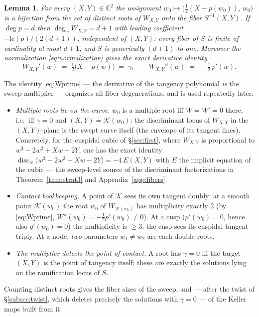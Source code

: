 \documentclass[11pt]{article}
\theoremstyle{plain}
\newtheorem{lemma}[theorem]{Lemma}
\theoremstyle{definition}
\theoremstyle{remark}
\newcommand{\C}{\mathbb{C}}
\begin{document}
\begin{lemma}\label{lem:fibroots}
For every $(X,Y)\in\C^2$ the assignment
$w_0\mapsto\bigl(\tfrac12(X-p(w_0)),\,w_0\bigr)$ is a bijection from the set
of distinct roots of $W_{X,Y}$ onto the fiber $S^{-1}(X,Y)$. If $\deg p=d$
then $\deg_wW_{X,Y}=d+1$ with leading coefficient
$-\mathrm{lc}(p)/(2(d+1))$, independent of $(X,Y)$: every fiber of $S$ is
finite of cardinality at most $d+1$, and $S$ is generically $(d+1)$-to-one.
Moreover the normalization \eqref{eq:normalization} gives the exact derivative
identity
\begin{equation}\label{eq:Wprime}
W_{X,Y}'(w)\;=\;\tfrac12\bigl(X-p(w)\bigr)\;=\;\gamma ,
\qquad
W_{X,Y}''(w)\;=\;-\tfrac12\,p'(w) .
\end{equation}
\end{lemma}

The identity \eqref{eq:Wprime} --- the derivative of the tangency polynomial
\emph{is} the sweep multiplier --- organizes all fiber degenerations, and is
used repeatedly later:
\begin{itemize}
\item \emph{Multiple roots lie on the curve.} $w_0$ is a multiple root iff
$W=W'=0$ there, i.e.\ iff $\gamma=0$ and $(X,Y)=\mathcal K(w_0)$: the
discriminant locus of $W_{X,Y}$ in the $(X,Y)$-plane is the swept curve
itself (the envelope of its tangent lines). Concretely, for the cuspidal cubic
of \S\ref{sec:first}, where $W_{X,Y}$ is proportional to $w^3-2w^2+Xw-2Y$,
one has the exact identity
$\operatorname{disc}_w\bigl(w^3-2w^2+Xw-2Y\bigr)=-4\,E(X,Y)$ with $E$ the
implicit equation of the cubic --- the sweep-level source of the discriminant
factorizations in Theorem~\ref{thm:strat3} and Appendix~\ref{app:fibers}.
\item \emph{Contact bookkeeping.} A point of $\mathcal K$ sees its own
tangent doubly: at a smooth point $\mathcal K(w_0)$ the root $w_0$ of
$W_{\mathcal K(w_0)}$ has multiplicity exactly $2$ (by \eqref{eq:Wprime},
$W''(w_0)=-\tfrac12p'(w_0)\neq0$). At a cusp ($p'(w_0)=0$, hence also
$q'(w_0)=0$) the multiplicity is $\ge3$: the cusp sees its cuspidal tangent
triply. At a node, \emph{two} parameters $w_1\neq w_2$ are each double roots.
\item \emph{The multiplier detects the point of contact.} A root has
$\gamma=0$ iff the target $(X,Y)$ is the point of tangency itself; these are
exactly the solutions lying on the ramification locus of $S$.
\end{itemize}

Counting distinct roots gives the fiber sizes of the sweep, and --- after the
twist of \S\ref{subsec:twist}, which deletes precisely the solutions with
$\gamma=0$ --- of the Keller maps built from it:
\end{document}

